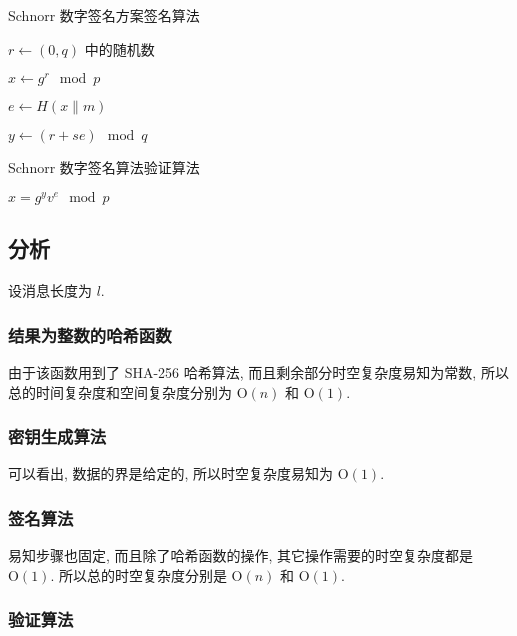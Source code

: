 \documentclass[12pt,a4paper]{article}
\begin{document}
\begin{algorithm}[H]
\caption{Schnorr 数字签名方案签名算法}

$ r \leftarrow (0, q) $ 中的随机数

$ x \leftarrow g^r \mod p $

$ e \leftarrow H(x \parallel m) $

$ y \leftarrow (r + s e) \mod q $
\end{algorithm}

\begin{algorithm}[H]
\caption{Schnorr 数字签名算法验证算法}

$ x = g^y v^e \mod p $

{
}
\end{algorithm}

\subsection*{分析}

设消息长度为 $ l $. 

\subsubsection*{结果为整数的哈希函数}

由于该函数用到了 SHA-256 哈希算法, 而且剩余部分时空复杂度易知为常数, 所以总的时间复杂度和空间复杂度分别为 $ \mathrm{O}(n) $ 和 $ \mathrm{O}(1) $. 

\subsubsection*{密钥生成算法}

可以看出, 数据的界是给定的, 所以时空复杂度易知为 $ \mathrm{O}(1) $. 

\subsubsection*{签名算法}

易知步骤也固定, 而且除了哈希函数的操作, 其它操作需要的时空复杂度都是 $ \mathrm{O}(1) $. 所以总的时空复杂度分别是 $ \mathrm{O}(n) $ 和 $ \mathrm{O}(1) $. 

\subsubsection*{验证算法}
\end{document}
